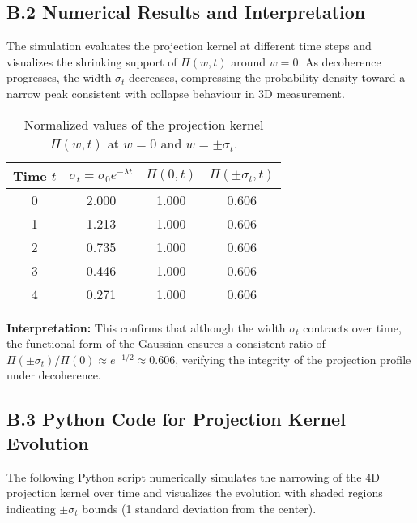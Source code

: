 \documentclass[12pt]{article}
\begin{document}
\subsection*{B.2 Numerical Results and Interpretation}

The simulation evaluates the projection kernel at different time steps and visualizes the shrinking support of $\Pi(w,t)$ around $w = 0$. As decoherence progresses, the width $\sigma_t$ decreases, compressing the probability density toward a narrow peak consistent with collapse behaviour in 3D measurement.

\begin{table}[H]
\centering
\begin{tabular}{c|c|c|c}
\textbf{Time $t$} & $\sigma_t = \sigma_0 e^{-\lambda t}$ & $\Pi(0, t)$ & $\Pi(\pm\sigma_t, t)$ \\
\hline
0 & 2.000 & 1.000 & 0.606 \\
1 & 1.213 & 1.000 & 0.606 \\
2 & 0.735 & 1.000 & 0.606 \\
3 & 0.446 & 1.000 & 0.606 \\
4 & 0.271 & 1.000 & 0.606 \\
\end{tabular}
\caption{Normalized values of the projection kernel $\Pi(w,t)$ at $w = 0$ and $w = \pm \sigma_t$.}
\end{table}

\textbf{Interpretation:}  
This confirms that although the width $\sigma_t$ contracts over time, the functional form of the Gaussian ensures a consistent ratio of $\Pi(\pm \sigma_t)/\Pi(0) \approx e^{-1/2} \approx 0.606$, verifying the integrity of the projection profile under decoherence.

\vspace{1em}

\subsection*{B.3 Python Code for Projection Kernel Evolution}

The following Python script numerically simulates the narrowing of the 4D projection kernel over time and visualizes the evolution with shaded regions indicating $\pm\sigma_t$ bounds (1 standard deviation from the center).
\end{document}
